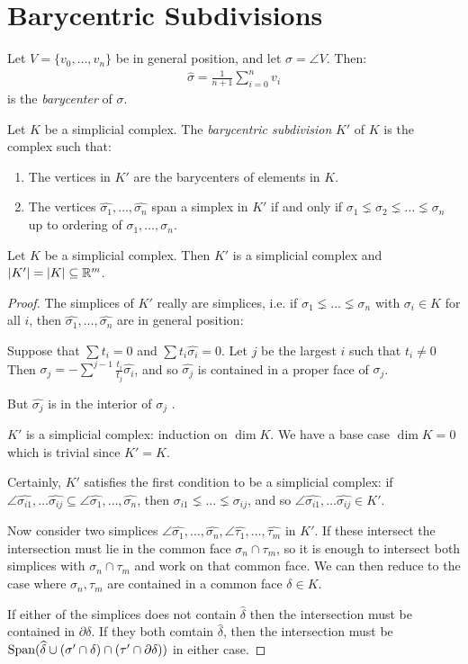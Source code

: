 \documentclass[10pt,a4paper]{article}
\begin{document}
\section{Barycentric Subdivisions}
Let $V = \{v_0, \ldots, v_n\}$ be in general position, and let $\sigma = \angle{V}$. Then:
\begin{align*}
\hat{\sigma} = \frac{1}{n+1}\sum_{i=0}^n v_i
\end{align*}
is the \emph{barycenter} of $\sigma$.

Let $K$ be a simplicial complex. The \emph{barycentric subdivision} $K'$ of $K$ is the complex such that:
\begin{enumerate}
\item The vertices in $K'$ are the barycenters of elements in $K$.
\item The vertices $\hat{\sigma_1}, \ldots, \hat{\sigma_n}$ span a simplex in $K'$ if and only if $\sigma_1 \lneq \sigma_2 \lneq \ldots \lneq \sigma_n$ up to ordering of $\sigma_1, \ldots, \sigma_n$.
\end{enumerate}

\begin{lemma}
Let $K$ be a simplicial complex. Then $K'$ is a simplicial complex and $|K'| = |K| \subseteq \mathbb{R}^m$.
\end{lemma}
\begin{proof}
The simplices of $K'$ really are simplices, i.e. if $\sigma_1 \lneq \ldots \lneq \sigma_n$ with $\sigma_i \in K$ for all $i$, then $\hat{\sigma_1}, \ldots, \hat{\sigma_n}$ are in general position:

Suppose that $\sum t_i = 0$ and $\sum t_i \hat{\sigma_i} = 0$. Let $j$ be the largest $i$ such that $t_i \neq 0$ Then $\sigma_j = -\sum^{j-1} \frac{t_i}{t_j}\hat{\sigma_i}$, and so $\hat{\sigma_j}$ is contained in a proper face of $\sigma_j$.

But $\hat{\sigma_j}$ is in the interior of $\sigma_j$ \contr.

$K'$ is a simplicial complex: induction on $\dim K$. We have a base case $\dim K = 0$ which is trivial since $K' = K$.

Certainly, $K'$ satisfies the first condition to be a simplicial complex: if $\angle{\hat{\sigma_{i1}}, \ldots \hat{\sigma_{ij}}}\subseteq \angle{\hat{\sigma_1}, \ldots, \hat{\sigma_n}}$, then $\sigma_{i1} \lneq \ldots \lneq \sigma_{ij}$, and so $\angle{\hat{\sigma_{i1}}, \ldots \hat{\sigma_{ij}}} \in K'$.

Now consider two simplices $\angle{\hat{\sigma_1}, \ldots, \hat{\sigma_n}}, \angle{\hat{\tau_1}, \ldots, \hat{\tau_m}}$ in $K'$. If these intersect the intersection must lie in the common face $\sigma_n \cap \tau_m$, so it is enough to intersect both simplices with $\sigma_n \cap \tau_m$ and work on that common face. We can then reduce to the case where $\sigma_n, \tau_m$ are contained in a common face $\delta \in K$.

If either of the simplices does not contain $\hat{\delta}$ then the intersection must be contained in $\partial \delta$. If they both comtain $\hat{\delta}$, then the intersection must be $\operatorname{Span}(\widehat{\delta}\cup (\sigma'\cap \delta) \cap (\tau' \cap \partial \delta))$ in either case.
\end{proof}
\end{document}
